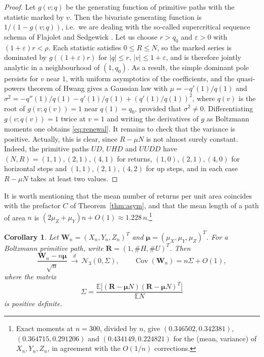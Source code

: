 \documentclass[11pt,reqno]{amsart}
\numberwithin{equation}{section}
\newtheorem{corollary}[theorem]{Corollary}
\theoremstyle{remark}
\begin{document}
\begin{proof}
Let $g(v;q)$ be the generating function of primitive paths with the statistic marked by
$v$. Then the bivariate generating function is $1/(1-g(v;q))$, i.e.\ we are dealing with
the so-called supercritical sequence schema of Flajolet and Sedgewick
\cite[Chapter~IX]{FS09}. Let us choose $r>q_0$ and $\varepsilon>0$ with
$(1+\varepsilon)r<\rho$. Each statistic satisfies $0\le R\le N$, so the marked series is
dominated by $g((1+\varepsilon)r)$ for $|q|\le r$, $|v|\le1+\varepsilon$, and is
therefore jointly analytic in a neighbourhood of $(1,q_0)$. As a result, the simple
dominant pole persists for $v$ near $1$, with uniform asymptotics of the coefficients,
and the quasi-powers theorem of Hwang \cite[Chapter~IX]{FS09} gives a Gaussian law with
$\mu=-q'(1)/q(1)$ and $\sigma^2=-q''(1)/q(1)-q'(1)/q(1)+(q'(1)/q(1))^2$, where $q(v)$
is the root of $g(v;q(v))=1$ near $q(1)=q_0$, provided that $\sigma^2\ne0$. Differentiating
$g(v;q(v))=1$ twice at $v=1$ and writing the derivatives of $g$ as Boltzmann moments one
obtains \eqref{eq:renewal}. It remains to check that the variance is positive. Actually,
this is clear, since $R-\mu N$ is not almost surely constant. Indeed, the primitive paths
$UD$, $UHD$ and $UUDD$ have $(N,R)=(1,1),(2,1),(4,1)$ for returns, $(1,0),(2,1),(4,0)$
for horizontal steps and $(1,1),(2,1),(4,2)$ for up steps, and in each case $R-\mu N$
takes at least two values.
\end{proof}

It is worth mentioning that the mean number of returns per unit area coincides with the
prefactor $C$ of Theorem~\ref{thm:asym}, and that the mean length of a path of area $n$
is $(2\mu_Z+\mu_Y)n+O(1)\approx1.228\,n$.\footnote{Exact moments at $n=300$, divided by
$n$, give $(0.346502,0.342381)$, $(0.364715,0.291206)$ and $(0.434149,0.224821)$ for the
(mean, variance) of $X_n,Y_n,Z_n$, in agreement with the $O(1/n)$ corrections.}

\begin{corollary}\label{cor:joint}
Let $\mathbf W_n=(X_n,Y_n,Z_n)^T$ and
$\boldsymbol\mu=(\mu_X,\mu_Y,\mu_Z)^T$. For a Boltzmann primitive path, write
$\mathbf R=(1,\#H,\#U)^T$. Then
\[
\frac{\mathbf W_n-n\boldsymbol\mu}{\sqrt n}
\ \xrightarrow{\ d\ }\ \mathcal N_3(0,\Sigma),\qquad
\operatorname{Cov}(\mathbf W_n)=n\Sigma+O(1),
\]
where the matrix
\begin{equation}\label{eq:joint-cov}
\Sigma=\frac{\mathbb E\big[(\mathbf R-\boldsymbol\mu N)
(\mathbf R-\boldsymbol\mu N)^T\big]}{\mathbb EN}
\end{equation}
is positive definite.
\end{corollary}
\end{document}

